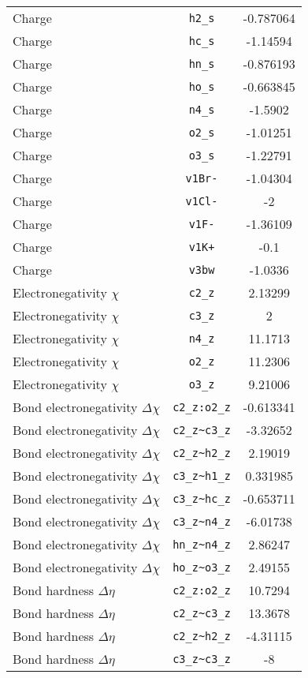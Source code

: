 \begin{table}[ht]
\begin{tabular}{lcc}
Charge & \verb^h2_s^ & -0.787064 \\ 
Charge & \verb^hc_s^ & -1.14594 \\ 
Charge & \verb^hn_s^ & -0.876193 \\ 
Charge & \verb^ho_s^ & -0.663845 \\ 
Charge & \verb^n4_s^ & -1.5902 \\ 
Charge & \verb^o2_s^ & -1.01251 \\ 
Charge & \verb^o3_s^ & -1.22791 \\ 
Charge & \verb^v1Br-^ & -1.04304 \\ 
Charge & \verb^v1Cl-^ & -2 \\ 
Charge & \verb^v1F-^ & -1.36109 \\ 
Charge & \verb^v1K+^ & -0.1 \\ 
Charge & \verb^v3bw^ & -1.0336 \\ 
Electronegativity $\chi$ & \verb^c2_z^ & 2.13299 \\ 
Electronegativity $\chi$ & \verb^c3_z^ & 2 \\ 
Electronegativity $\chi$ & \verb^n4_z^ & 11.1713 \\ 
Electronegativity $\chi$ & \verb^o2_z^ & 11.2306 \\ 
Electronegativity $\chi$ & \verb^o3_z^ & 9.21006 \\ 
Bond electronegativity $\Delta\chi$ & \verb^c2_z:o2_z^ & -0.613341 \\ 
Bond electronegativity $\Delta\chi$ & \verb^c2_z~c3_z^ & -3.32652 \\ 
Bond electronegativity $\Delta\chi$ & \verb^c2_z~h2_z^ & 2.19019 \\ 
Bond electronegativity $\Delta\chi$ & \verb^c3_z~h1_z^ & 0.331985 \\ 
Bond electronegativity $\Delta\chi$ & \verb^c3_z~hc_z^ & -0.653711 \\ 
Bond electronegativity $\Delta\chi$ & \verb^c3_z~n4_z^ & -6.01738 \\ 
Bond electronegativity $\Delta\chi$ & \verb^hn_z~n4_z^ & 2.86247 \\ 
Bond electronegativity $\Delta\chi$ & \verb^ho_z~o3_z^ & 2.49155 \\ 
Bond hardness $\Delta\eta$ & \verb^c2_z:o2_z^ & 10.7294 \\ 
Bond hardness $\Delta\eta$ & \verb^c2_z~c3_z^ & 13.3678 \\ 
Bond hardness $\Delta\eta$ & \verb^c2_z~h2_z^ & -4.31115 \\ 
Bond hardness $\Delta\eta$ & \verb^c3_z~c3_z^ & -8 \\ 

\end{tabular}
\end{table}
